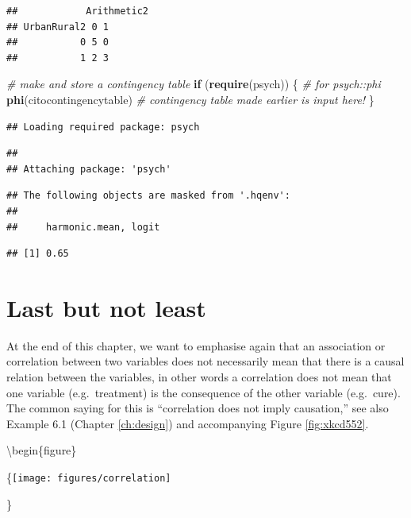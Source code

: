 \documentclass[
]{book}
\newenvironment{Shaded}{\begin{snugshade}}{\end{snugshade}}
\newcommand{\CommentTok}[1]{\textcolor[rgb]{0.56,0.35,0.01}{\textit{#1}}}
\newcommand{\ControlFlowTok}[1]{\textcolor[rgb]{0.13,0.29,0.53}{\textbf{#1}}}
\newcommand{\KeywordTok}[1]{\textcolor[rgb]{0.13,0.29,0.53}{\textbf{#1}}}
\newcommand{\NormalTok}[1]{#1}
\begin{document}
\begin{verbatim}
##            Arithmetic2
## UrbanRural2 0 1
##           0 5 0
##           1 2 3
\end{verbatim}

\begin{Shaded}
\begin{Highlighting}[]
\CommentTok{\# make and store a contingency table}
\ControlFlowTok{if}\NormalTok{ (}\KeywordTok{require}\NormalTok{(psych)) \{ }\CommentTok{\# for psych::phi}
  \KeywordTok{phi}\NormalTok{(citocontingencytable) }\CommentTok{\# contingency table made earlier is input here!}
\NormalTok{\}}
\end{Highlighting}
\end{Shaded}

\begin{verbatim}
## Loading required package: psych
\end{verbatim}

\begin{verbatim}
## 
## Attaching package: 'psych'
\end{verbatim}

\begin{verbatim}
## The following objects are masked from '.hqenv':
## 
##     harmonic.mean, logit
\end{verbatim}

\begin{verbatim}
## [1] 0.65
\end{verbatim}

\hypertarget{sec:correlationcausation}{%
\section{Last but not least}\label{sec:correlationcausation}}

At the end of this chapter, we want to emphasise again that an association or correlation
between two variables does not necessarily mean
that there is a causal relation between the variables, in other words
a correlation does not mean that one variable (e.g.~treatment) is the consequence of
the other variable (e.g.~cure).
The common saying for this is ``correlation does not imply
causation,'' see also Example 6.1 (Chapter \ref{ch:design})
and accompanying Figure \ref{fig:xkcd552}.

\textbackslash begin\{figure\}

\{\centering \texttt{[image: figures/correlation]}

\}
\end{document}
